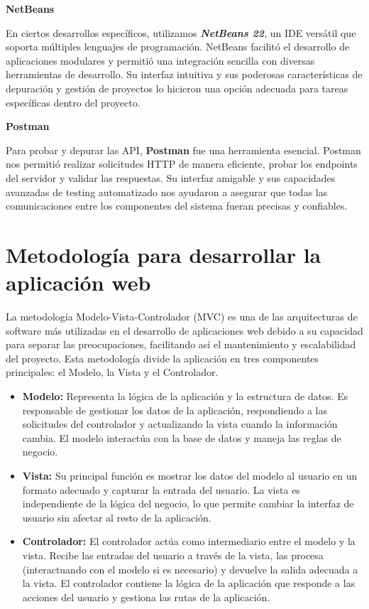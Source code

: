 \textbf{NetBeans}

En ciertos desarrollos específicos, utilizamos \textbf{\textit{NetBeans 22}}, un IDE versátil que soporta múltiples lenguajes de programación. NetBeans facilitó el desarrollo de aplicaciones modulares y permitió una integración sencilla con diversas herramientas de desarrollo. Su interfaz intuitiva y sus poderosas características de depuración y gestión de proyectos lo hicieron una opción adecuada para tareas específicas dentro del proyecto.

\newpage
\textbf{Postman}

Para probar y depurar las API, \textbf{Postman} fue una herramienta esencial. Postman nos permitió realizar solicitudes HTTP de manera eficiente, probar los endpoints del servidor y validar las respuestas. Su interfaz amigable y sus capacidades avanzadas de testing automatizado nos ayudaron a asegurar que todas las comunicaciones entre los componentes del sistema fueran precisas y confiables.



\section{Metodología para desarrollar la aplicación web}

La metodología Modelo-Vista-Controlador (MVC) \cite{Deinum2012} es una de las arquitecturas de software más utilizadas en el desarrollo de aplicaciones web debido a su capacidad para separar las preocupaciones, facilitando así el mantenimiento y escalabilidad del proyecto. Esta metodología divide la aplicación en tres componentes principales: el Modelo, la Vista y el Controlador.

\begin{itemize}
	\item \textbf{Modelo:} Representa la lógica de la aplicación y la estructura de datos. Es responsable de gestionar los datos de la aplicación, respondiendo a las solicitudes del controlador y actualizando la vista cuando la información cambia. El modelo interactúa con la base de datos y maneja las reglas de negocio.
	\item \textbf{Vista:} Su principal función es mostrar los datos del modelo al usuario en un formato adecuado y capturar la entrada del usuario. La vista es independiente de la lógica del negocio, lo que permite cambiar la interfaz de usuario sin afectar al resto de la aplicación.
	\item \textbf{Controlador:} El controlador actúa como intermediario entre el modelo y la vista. Recibe las entradas del usuario a través de la vista, las procesa (interactuando con el modelo si es necesario) y devuelve la salida adecuada a la vista. El controlador contiene la lógica de la aplicación que responde a las acciones del usuario y gestiona las rutas de la aplicación.
\end{itemize}

